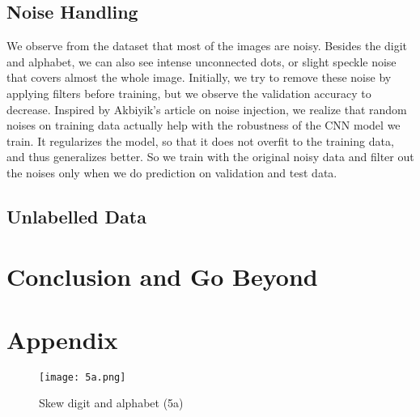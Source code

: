 \documentclass[11pt]{diazessay} %
\begin{document}
\subsection{Noise Handling}
We observe from the dataset that most of the images are noisy. Besides the digit and alphabet, we can also see intense unconnected dots, or slight speckle noise that covers almost the whole image. Initially, we try to remove these noise by applying filters before training, but we observe the validation accuracy to decrease. Inspired by Akbiyik's article on noise injection\cite{akbiyik}, we realize that random noises on training data actually help with the robustness of the CNN model we train. It regularizes the model, so that it does not overfit to the training data, and thus generalizes better. So we train with the original noisy data and filter out the noises only when we do prediction on validation and test data.

\subsection{Unlabelled Data}

\section{Conclusion and Go Beyond}


\section{Appendix}

\begin{figure}[H]
	\centering
	\texttt{[image: 5a.png]}
	\caption{Skew digit and alphabet (5a)}
\end{figure}

\printbibliography %
\end{document}
